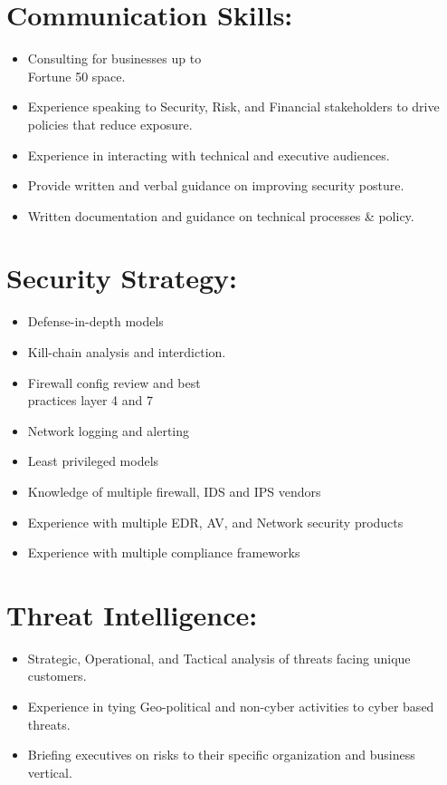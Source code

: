 \documentclass[a4paper,10pt]{article}
\begin{document}
\begin{multicols}{2}

\section{Communication Skills:}

\begin{itemize}[leftmargin=*]
    \item Consulting for businesses up to \\ Fortune 50 space. 
    \item Experience speaking to Security, Risk, and Financial stakeholders to drive policies that reduce exposure.
    \item Experience in interacting with technical and executive audiences.
    \item Provide written and verbal guidance on improving security posture.
    \item Written documentation and guidance on technical processes \& policy. 
\end{itemize}

\section{Security Strategy: }
\begin{itemize}[leftmargin=*]
    \item Defense-in-depth models
    \item Kill-chain analysis and interdiction. 
    \item Firewall config review and best \\ practices layer 4 and 7
    \item Network logging and alerting
    \item Least privileged models
    \item Knowledge of multiple firewall, IDS and IPS vendors
    \item Experience with multiple EDR, AV, and Network security products
    \item Experience with multiple compliance frameworks
\end{itemize}

\section{Threat Intelligence:}
\begin{itemize}[leftmargin=*]
    \item Strategic, Operational, and Tactical analysis of threats facing unique customers.
    \item Experience in tying Geo-political and non-cyber activities to cyber based threats.
    \item Briefing executives on risks to their specific organization and business vertical. 
\end{itemize}


\end{multicols}
\end{document}
